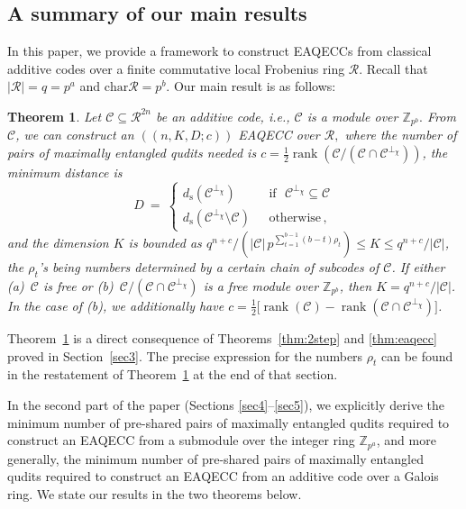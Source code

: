 \documentclass{article}
\DeclareMathOperator{\rank}{rank}
\def\Z{\mathbb{Z}}
\newtheorem{thm}{Theorem}[section]
\theoremstyle{remark}
\theoremstyle{definition}
\numberwithin{equation}{section}
\begin{document}
\subsection{A summary of our main results}
In this paper, we provide a framework to construct EAQECCs from classical additive codes over a finite  commutative local Frobenius ring $\mathcal{R}$. Recall that $|\mathcal{R}| = q = p^a$ and $\text{char}\mathcal{R} = p^b$. Our main result  is as follows:

  \begin{thm}\label{dt1} Let $\mathcal{C} \subseteq \mathcal{R}^{2n}$ be an additive code,  i.e.,  $\mathcal{C}$ is a module over $\mathbb{Z}_{p^b}.$  From $\mathcal{C}$, we can construct an $((n,K, D; c))$ EAQECC over $\mathcal{R},$ where the number of pairs of maximally entangled qudits needed is $c = \frac12 \rank(\mathcal{C}/(\mathcal{C} \cap \mathcal{C}^{\perp_{{\chi}}}))$, the minimum distance is
\begin{equation*}
D~=~\left\{\begin{array}{ll}
d_{\mathrm{s}}(\mathcal{C}^{\perp_\chi}) & \text{~~if~~} \mathcal{C}^{\perp_\chi} \subseteq \mathcal{C} \\
d_{\mathrm{s}}(\mathcal{C}^{\perp_\chi}\setminus \mathcal{C}) & \text{~~otherwise} \, ,
\end{array}\right. 
\end{equation*}
and the dimension $K$ is bounded as $q^{n+c}/ (|\mathcal{C}| \, {p^{\sum_{t=1}^{b-1} (b-t)\rho_t}}) \leq  K \leq q^{n+c}/|\mathcal{C}|$, the $\rho_t$'s being numbers determined by a certain chain of subcodes of $\mathcal{C}$. If either \emph{(a)}~$\mathcal{C}$ is free or \emph{(b)}~$\mathcal{C}/(\mathcal{C} \cap \mathcal{C}^{\perp_{\chi}})$ is a free module over $\mathbb{Z}_{p^b}$, then $K = q^{n+c}/|\mathcal{C}|$. In the case of \emph{(b)}, we additionally have $c=\frac12 \bigl[\rank(\mathcal{C}) - \rank(\mathcal{C} \cap \mathcal{C}^{\perp_\chi})\bigr]$.
 \end{thm}

Theorem~\ref{dt1} is a direct consequence of Theorems~\ref{thm:2step} and \ref{thm:eaqecc} proved in Section~\ref{sec3}. The precise expression for the numbers $\rho_t$ can be found in the restatement of Theorem~\ref{dt1} at the end of that section.

\medskip
 
In the second part of the paper (Sections \ref{sec4}--\ref{sec5}), we explicitly derive the minimum number of pre-shared pairs of maximally entangled qudits required to construct an EAQECC from a submodule over the integer ring $\Z_{p^a}$, and more generally, the minimum number of pre-shared pairs of maximally entangled qudits required to construct an EAQECC from an additive code over a Galois ring.  We state our results in the two theorems below. 
\end{document}

